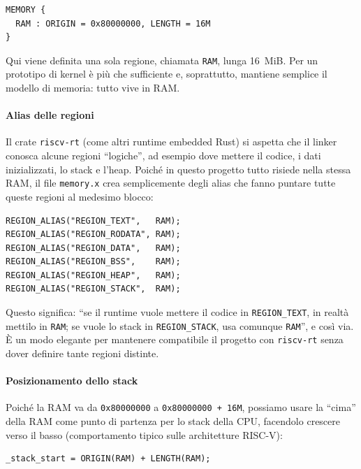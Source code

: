 \documentclass[italian, Lau, oneside]{sapthesis} %
\begin{document}
\begin{center}
\begin{verbatim}
MEMORY {
  RAM : ORIGIN = 0x80000000, LENGTH = 16M
}
\end{verbatim}
\end{center}

Qui viene definita una sola regione, chiamata \texttt{RAM}, lunga 16~MiB. Per un prototipo di kernel è più che sufficiente e, soprattutto, mantiene semplice il modello di memoria: tutto vive in RAM.

\paragraph{Alias delle regioni}
Il crate \texttt{riscv-rt} (come altri runtime embedded Rust) si aspetta che il linker conosca alcune regioni “logiche”, ad esempio dove mettere il codice, i dati inizializzati, lo stack e l’heap.  
Poiché in questo progetto tutto risiede nella stessa RAM, il file \texttt{memory.x} crea semplicemente degli alias che fanno puntare tutte queste regioni al medesimo blocco:

\begin{center}
\begin{verbatim}
REGION_ALIAS("REGION_TEXT",   RAM);
REGION_ALIAS("REGION_RODATA", RAM);
REGION_ALIAS("REGION_DATA",   RAM);
REGION_ALIAS("REGION_BSS",    RAM);
REGION_ALIAS("REGION_HEAP",   RAM);
REGION_ALIAS("REGION_STACK",  RAM);
\end{verbatim}
\end{center}

Questo significa: “se il runtime vuole mettere il codice in \texttt{REGION\_TEXT}, in realtà mettilo in \texttt{RAM}; se vuole lo stack in \texttt{REGION\_STACK}, usa comunque \texttt{RAM}”, e così via.  
È un modo elegante per mantenere compatibile il progetto con \texttt{riscv-rt} senza dover definire tante regioni distinte.

\paragraph{Posizionamento dello stack}
Poiché la RAM va da \texttt{0x80000000} a \texttt{0x80000000 + 16M}, possiamo usare la “cima” della RAM come punto di partenza per lo stack della CPU, facendolo crescere verso il basso (comportamento tipico sulle architetture RISC-V):

\begin{center}
\begin{verbatim}
_stack_start = ORIGIN(RAM) + LENGTH(RAM);
\end{verbatim}
\end{center}
\end{document}
